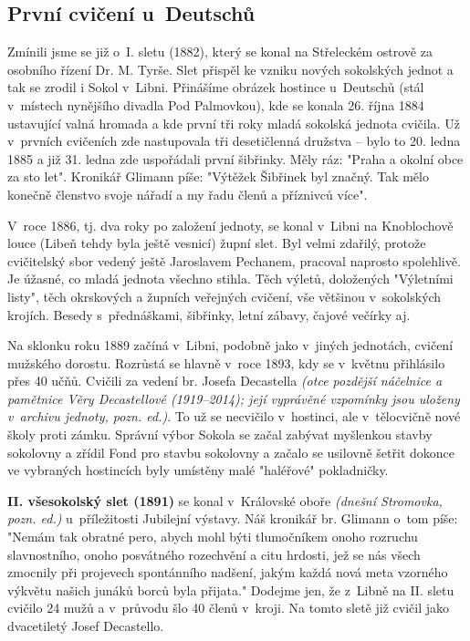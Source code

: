 \documentclass[a5paper, 12pt, twoside]{article}
\newcommand{\pozned}[1]{%
\textit{#1}}
\begin{document}
\subsection{První cvičení u~Deutschů}
Zmínili jsme se již o~I. sletu (1882), který se konal na Střeleckém ostrově za osobního řízení Dr. M. Tyrše. Slet přispěl ke vzniku nových sokolských jednot a tak se zrodil i Sokol v~Libni. Přinášíme obrázek hostince u~Deutschů (stál v~místech nynějšího divadla Pod Palmovkou), kde se konala 26. října 1884 ustavující valná hromada a kde první tři roky mladá sokolská jednota cvičila. Už v~prvních cvičeních zde nastupovala tři desetičlenná družstva – bylo to 20. ledna 1885 a již 31. ledna zde uspořádali první šibřinky. Měly ráz: "Praha a okolní obce za sto let". Kronikář Glimann píše: "Výtěžek Šibřinek byl značný. Tak mělo konečně členstvo svoje nářadí a my řadu členů a příznivců více".

V~roce 1886, tj. dva roky po založení jednoty, se konal v~Libni na Knoblochově louce (Libeň tehdy byla ještě vesnicí) župní slet. Byl velmi zdařilý, protože cvičitelský sbor vedený ještě Jaroslavem Pechanem, pracoval naprosto spolehlivě. Je úžasné, co mladá jednota všechno stihla. Těch výletů, doložených "Výletními listy", těch okrskových a župních veřejných cvičení, vše většinou v~sokolských krojích. Besedy s~přednáškami, šibřinky, letní zábavy, čajové večírky aj.


Na sklonku roku 1889 začíná v~Libni, podobně jako v~jiných jednotách, cvičení mužského dorostu. Rozrůstá se hlavně v~roce 1893, kdy se v~květnu přihlásilo přes 40 učňů. Cvičili za vedení br. Josefa Decastella \pozned{(otce pozdější náčelnice a pamětnice Věry Decastellové (1919–2014); její vyprávěné vzpomínky jsou uloženy v~archivu jednoty, pozn. ed.)}. To už se necvičilo v~hostinci, ale v~tělocvičně nové školy proti zámku. Správní výbor Sokola se začal zabývat myšlenkou stavby sokolovny a zřídil Fond pro stavbu sokolovny a začalo se usilovně šetřit dokonce ve vybraných hostincích byly umístěny malé "haléřové" pokladničky.

\textbf{II. všesokolský slet (1891)} se konal v~Královské oboře \pozned{(dnešní Stromovka, pozn. ed.)} u~příležitosti Jubilejní výstavy. Náš kronikář br. Glimann o~tom píše: "Nemám tak obratné pero, abych mohl býti tlumočníkem onoho rozruchu slavnostního, onoho posvátného rozechvění a citu hrdosti, jež se nás všech zmocnily při projevech spontánního nadšení, jakým každá nová meta vzorného výkvětu našich junáků borců byla přijata." Dodejme jen, že z~Libně na II. sletu cvičilo 24 mužů a v~průvodu šlo 40 členů v~kroji. Na tomto sletě již cvičil jako dvacetiletý Josef Decastello.
\end{document}
